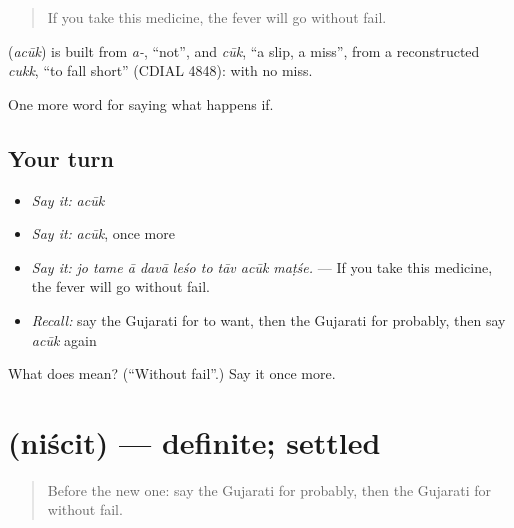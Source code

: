 \begin{quote}
If you take this medicine, the fever will go without fail.
\end{quote}

\begin{cousinweb}
\textbf{} (\emph{acūk}) is built from \emph{a-}, \textquotedblleft{}not\textquotedblright{}, and \emph{cūk}, \textquotedblleft{}a slip, a miss\textquotedblright{}, from a reconstructed \emph{cukk}, \textquotedblleft{}to fall short\textquotedblright{} (CDIAL 4848): with no miss.
\end{cousinweb}

\begin{grammarlens}[title={What you've built}]
One more word for saying what happens if.
\end{grammarlens}

\subsection*{Your turn}
\begin{itemize}
\raggedright
  \item \emph{Say it:} \emph{acūk}
  \item \emph{Say it:} \emph{acūk}, once more
  \item \emph{Say it:} \emph{jo tame ā davā leśo to tāv acūk maṭśe.} — If you take this medicine, the fever will go without fail.
  \item \emph{Recall:} say the Gujarati for to want, then the Gujarati for probably, then say \emph{acūk} again
\end{itemize}

\begin{tcolorbox}[breakable,colback=teal!4,colframe=teal!35!black,title={Before you move on}]
What does  mean? (\textquotedblleft{}Without fail\textquotedblright{}.) Say it once more.
\end{tcolorbox}
\section[\texorpdfstring{\gu{નિશ્ચિત} (niścit)}{નિશ્ચિત (niścit)}]{ (niścit) — definite; settled}

\label{lesson:GU-C367-niscit}



\begin{quote}
Before the new one: say the Gujarati for probably, then the Gujarati for without fail.
\end{quote}

